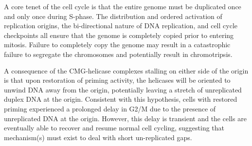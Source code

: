 

A core tenet of the cell cycle is that the entire genome must be duplicated once and only once during S-phase.  The distribution and ordered activation of replication origins, the bi-directional nature of DNA replication, and cell cycle checkpoints all ensure that the genome is completely copied prior to entering mitosis. Failure to completely copy the genome may result in a catastrophic failure to segregate the chromosomes and potentially result in chromotripsis.   

A consequence of the CMG-helicase complexes stalling on either side of the origin is that upon restoration of priming activity, the helicases will be oriented to unwind DNA away from the origin, potentially leaving a stretch of unreplicated duplex DNA at the origin.  Consistent with this hypothesis, cells with restored priming experienced a prolonged delay in G2/M due to the presence of unreplicated DNA at the origin\citep{}.  However, this delay is transient and the cells are eventually able to recover and resume normal cell cycling, suggesting that mechanism(s) must exist to deal with short un-replicated gaps.


